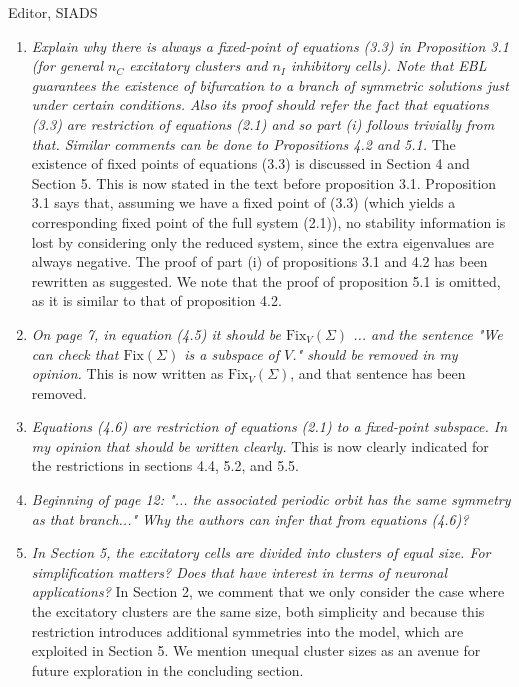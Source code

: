 \documentclass[11pt]{letter}
\begin{document}
\begin{letter}{Editor, SIADS}
\begin{enumerate}
\item \emph{Explain why there is always a fixed-point of equations (3.3) in Proposition 3.1 (for general $n_C$ excitatory clusters and $n_I$ inhibitory cells). Note that EBL guarantees the existence of bifurcation to a branch of symmetric solutions just under certain conditions. Also its proof should refer the fact that equations (3.3) are restriction of equations (2.1) and so part (i) follows trivially from that. Similar comments can be done to Propositions 4.2 and 5.1.}
The existence of fixed points of equations (3.3) is discussed in Section 4 and Section 5. This is now stated in the text before proposition 3.1. Proposition 3.1 says that, assuming we have a fixed point of (3.3) (which yields a corresponding fixed point of the full system (2.1)), no stability information is lost by considering only the reduced system, since the extra eigenvalues are always negative. The proof of part (i) of propositions 3.1 and 4.2 has been rewritten as suggested. We note that the proof of proposition 5.1 is omitted, as it is similar to that of proposition 4.2.
\vspace{4mm} 

\item \emph{On page 7, in equation (4.5) it should be $\textrm{Fix}_V(\Sigma)$ ... and the sentence "We can check that $\textrm{Fix}(\Sigma)$ is a subspace of $V$." should be removed in my opinion. }
This is now written as $\textrm{Fix}_V(\Sigma)$, and that sentence has been removed.
\vspace{4mm} 

\item \emph{Equations (4.6) are restriction of equations (2.1) to a fixed-point subspace. In my opinion that should be written clearly.}  This is now clearly indicated for the restrictions in sections 4.4, 5.2, and 5.5.
\vspace{4mm} 

\item \emph{
Beginning of page 12: "... the associated periodic orbit has the same symmetry as that branch..." Why the authors can infer that from equations (4.6)? }
\vspace{4mm} 

\item \emph{In Section 5, the excitatory cells are divided into clusters of equal size. For simplification matters? Does that have interest in terms of neuronal applications? } In Section 2, we comment that we only consider the case where the excitatory clusters are the same size, both simplicity and because this restriction introduces additional symmetries into the model, which are exploited in Section 5. We mention unequal cluster sizes as an avenue for future exploration in the concluding section.
\vspace{4mm} 


\end{enumerate}
\end{letter}
\end{document}
